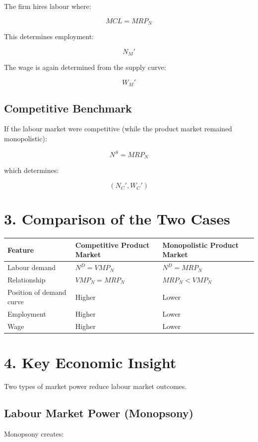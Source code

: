 \documentclass[12pt]{article}
\begin{document}
The firm hires labour where:

\[
MCL = MRP_N
\]

This determines employment:

\[
N_M'
\]

The wage is again determined from the supply curve:

\[
W_M'
\]

\subsection*{Competitive Benchmark}

If the labour market were competitive (while the product market remained monopolistic):

\[
N^S = MRP_N
\]

which determines:

\[
(N_C', W_C')
\]

\section*{3. Comparison of the Two Cases}

\begin{center}
\begin{tabular}{llll}
\toprule
\textbf{Feature} & \textbf{Competitive Product Market} & \textbf{Monopolistic Product Market} \\
\midrule
Labour demand & $N^D = VMP_N$ & $N^D = MRP_N$ \\
Relationship & $VMP_N = MRP_N$ & $MRP_N < VMP_N$ \\
Position of demand curve & Higher & Lower \\
Employment & Higher & Lower \\
Wage & Higher & Lower \\
\bottomrule
\end{tabular}
\end{center}

\section*{4. Key Economic Insight}

Two types of market power reduce labour market outcomes.

\subsection*{Labour Market Power (Monopsony)}

Monopsony creates:
\end{document}
